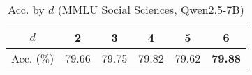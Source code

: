 \begingroup
\renewcommand{\arraystretch}{1}
\begin{table}[t]
    \caption{Acc. by $d$ (MMLU Social Sciences, Qwen2.5-7B)}
    \label{tab:acc_mmlu_social_science_window_size}
    \centering
    \footnotesize
    \begin{tabular}{C{0.095}C{0.07}C{0.07}C{0.07}C{0.07}C{0.07}}
        \toprule
        $d$         & \textbf{2} & \textbf{3} & \textbf{4} & \textbf{5} & \textbf{6}     \\
        \midrule
        Acc. ($\%$) & 79.66      & 79.75      & 79.82      & 79.62      & \textbf{79.88} \\
        \bottomrule
    \end{tabular}
\end{table}
\endgroup